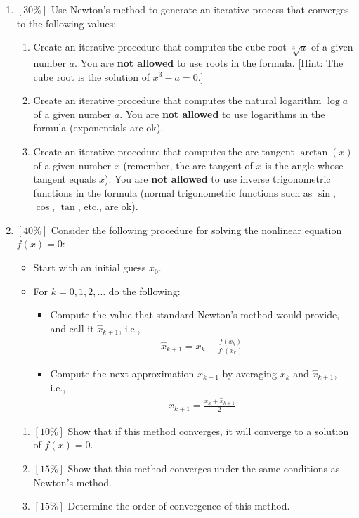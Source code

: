 \documentclass{article}
\begin{document}
\begin{enumerate}
\item
$[30\%]$ Use Newton's method to generate an iterative process that converges to
the following values:
\begin{enumerate}
\item
Create an iterative procedure that computes the cube root $\sqrt[3]{a}$ of a
given number $a$. You are \textbf{not allowed} to use roots in the formula.
[Hint: The cube root is the solution of $x^3-a=0$.]
\item
Create an iterative procedure that computes the natural logarithm $\log a$ of a
given number $a$. You are \textbf{not allowed} to use logarithms in the formula
(exponentials are ok).
\item
Create an iterative procedure that computes the arc-tangent $\arctan(x)$ of a
given number $x$ (remember, the arc-tangent of $x$ is the angle whose tangent
equals $x$). You are \textbf{not allowed} to use inverse trigonometric functions
in the formula (normal trigonometric functions such as $\sin$, $\cos$, $\tan$,
etc., are ok).
\end{enumerate}

\item
$[40\%]$ Consider the following procedure for solving the nonlinear equation
$f(x)=0$:
\begin{itemize}
\item
Start with an initial guess $x_0$.
\item
For $k=0,1,2,\ldots$ do the following:
\begin{itemize}
\item
Compute the value that standard Newton's method would provide, and call it
$\hat x_{k+1}$, i.e.,
\begin{eqnarray*}
\hat x_{k+1}=x_k-\frac{f(x_k)}{f'(x_k)}
\end{eqnarray*}
\item
Compute the next approximation $x_{k+1}$ by averaging $x_k$ and $\hat x_{k+1}$,
i.e.,
\begin{eqnarray*}
x_{k+1}=\frac{x_k+\hat x_{k+1}}{2}
\end{eqnarray*}
\end{itemize}
\end{itemize}
\begin{enumerate}
\item
$[10\%]$ Show that if this method converges, it will converge to a solution of
$f(x)=0$.
\item
$[15\%]$ Show that this method converges under the same conditions as Newton's
method.
\item
$[15\%]$ Determine the order of convergence of this method.
\end{enumerate}
\end{enumerate}
\end{document}
